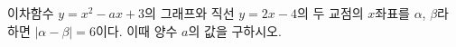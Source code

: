 이차함수 $y=x^2-ax+3$의 그래프와 직선 $y=2x-4$의 두 교점의 $x$좌표를 $\alpha$, $\beta$라 하면 $|\alpha-\beta|=6$이다. 이때 양수 $a$의 값을 구하시오.

